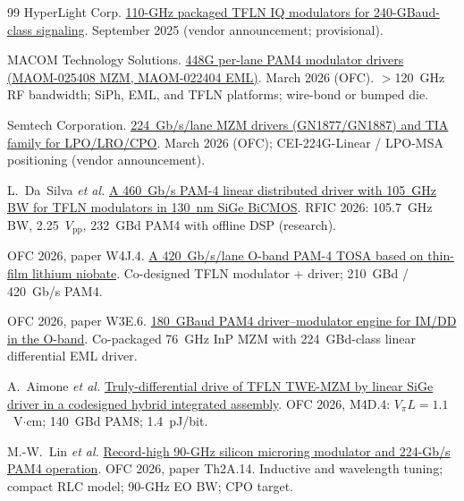 \begin{thebibliography}{99}
HyperLight Corp.
\newblock \href{https://www.hyperlightcorp.com/news/hyperlight-announces-110-ghz-modulators}{110-GHz packaged TFLN IQ modulators for 240-GBaud-class signaling}.
\newblock September 2025 (vendor announcement; provisional).

MACOM Technology Solutions.
\newblock \href{https://www.macom.com/updates/news/2026/macom-announces-two-new-448g-per-lane-drivers-for-3-2t-data-cent}{448G per-lane PAM4 modulator drivers (MAOM-025408 MZM, MAOM-022404 EML)}.
\newblock March 2026 (OFC).
\newblock $>$120~GHz RF bandwidth; SiPh, EML, and TFLN platforms; wire-bond or bumped die.

Semtech Corporation.
\newblock \href{https://www.semtech.com/company/press/semtech-launches-224-gbps-ic-family-for-linear-optics-era}{224~Gb/s/lane MZM drivers (GN1877/GN1887) and TIA family for LPO/LRO/CPO}.
\newblock March 2026 (OFC); CEI-224G-Linear / LPO-MSA positioning (vendor announcement).

L.~Da~Silva \emph{et al.}
\newblock \href{https://rfic-ieee.org/paper_abstract/1148}{A 460~Gb/s PAM-4 linear distributed driver with 105~GHz BW for TFLN modulators in 130~nm SiGe BiCMOS}.
\newblock RFIC 2026: 105.7~GHz BW, 2.25~$V_{\mathrm{pp}}$, 232~GBd PAM4 with offline DSP (research).

OFC 2026, paper W4J.4.
\newblock \href{https://doi.org/10.1364/OFC.2026.W4J.4}{A 420~Gb/s/lane O-band PAM-4 TOSA based on thin-film lithium niobate}.
\newblock Co-designed TFLN modulator + driver; 210~GBd / 420~Gb/s PAM4.

OFC 2026, paper W3E.6.
\newblock \href{https://doi.org/10.1364/OFC.2026.W3E.6}{180~GBaud PAM4 driver--modulator engine for IM/DD in the O-band}.
\newblock Co-packaged 76~GHz InP MZM with 224~GBd-class linear differential EML driver.

A.~Aimone \emph{et al.}
\newblock \href{https://doi.org/10.1364/OFC.2026.M4D.4}{Truly-differential drive of TFLN TWE-MZM by linear SiGe driver in a codesigned hybrid integrated assembly}.
\newblock OFC 2026, M4D.4: $V_\pi L=1.1$~V$\cdot$cm; 140~GBd PAM8; 1.4~pJ/bit.

M.-W.~Lin \emph{et al.}
\newblock \href{https://doi.org/10.1364/OFC.2026.Th2A.14}{Record-high 90-GHz silicon microring modulator and 224-Gb/s PAM4 operation}.
\newblock OFC 2026, paper Th2A.14.
\newblock Inductive and wavelength tuning; compact RLC model; 90-GHz EO BW; CPO target.


\end{thebibliography}
